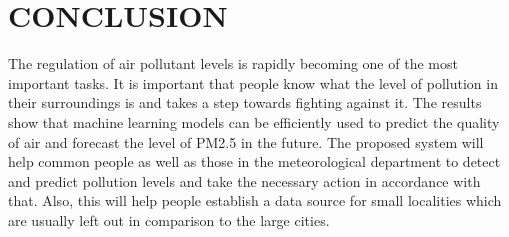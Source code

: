 \pagebreak
{}
\chapter{CONCLUSION}
The regulation of air pollutant levels is rapidly
becoming one of the most important tasks. It is
important that people know what the level of
pollution in their surroundings is and takes a step
towards fighting against it.
The results show that machine learning
models can be efficiently used to predict the
quality of air and forecast the level of PM2.5 in
the future.
The proposed system will help common people as
well as those in the meteorological department to
detect and predict pollution levels and take the
necessary action in accordance with that. Also,
this will help people establish a data source for
small localities which are usually left out in
comparison to the large cities.
